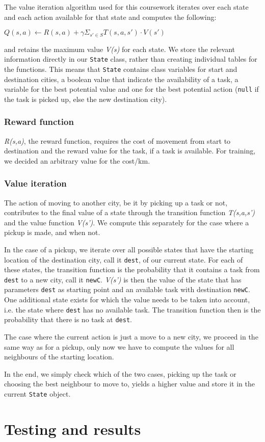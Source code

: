 \documentclass[12pt,a4paper]{article}
\begin{document}
The value iteration algorithm used for this coursework iterates over each state and each action available for that state and computes the following:
\begin{center}
$Q(s,a) \longleftarrow R(s,a) + \gamma \Sigma_{s' \in S} T(s,a,s')\cdot V(s')$ 
\end{center}
and retains the maximum value \textit{V(s)} for each state. We store the relevant information directly in our \texttt{State} class, rather than creating individual tables for the functions. This means that \texttt{State} contains class variables for start and destination cities, a boolean value that indicate the availability of a task, a variable for the best potential value and one for the best potential action (\texttt{null} if the task is picked up, else the new destination city).

\subsubsection*{Reward function}
\textit{R(s,a)}, the reward function, requires the cost of movement from start to destination and the reward value for the task, if a task is available. For training, we decided an arbitrary value for the cost/km.

\subsubsection*{Value iteration}
The action of moving to another city, be it by picking up a task or not, contributes to the final value of a state through the transition function \textit{T(s,a,s')} and the value function \textit{V(s')}. We compute this separately for the case where a pickup is made, and when not. 

In the case of a pickup, we iterate over all possible states that have the starting location of the destination city, call it \texttt{dest}, of our current state. For each of these states, the transition function is the probability that it contains a task from \texttt{dest} to a new city, call it \texttt{newC}. \textit{V(s')} is then the value of the state that has parameters \texttt{dest} as starting point and an available task with destination \texttt{newC}. One additional state exists for which the value needs to be taken into account, i.e. the state where \texttt{dest} has no available task. The transition function then is the probability that there is no task at \texttt{dest}.

The case where the current action is just a move to a new city, we proceed in the same way as for a pickup, only now we have to compute the values for all neighbours of the starting location.

In the end, we simply check which of the two cases, picking up the task or choosing the best neighbour to move to, yields a higher value and store it in the current \texttt{State} object.

\section{Testing and results}
\end{document}
